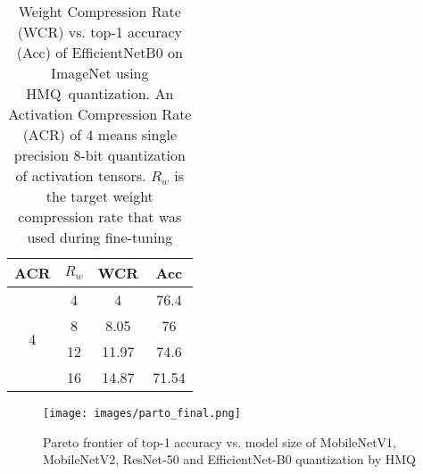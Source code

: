 \documentclass{article}
\newcommand{\qb}{HMQ}
\begin{document}
\begin{table}[h]
	\centering
	\caption{
		Weight Compression Rate (WCR) vs. top-1 accuracy (Acc) of EfficientNetB0 on ImageNet using \qb\ quantization.
		An Activation Compression Rate (ACR) of 4 means single precision 8-bit quantization of activation tensors.
		$R_w$ is the target weight compression rate that was used during fine-tuning
	}
	\label{tab:efficientnet_imagenet}
	\begin{tabular}{cccc}
		\hline
		ACR                & $R_w$ & WCR   & Acc   \\ \hline
		\multirow{4}{*}{4} & 4     & 4     & 76.4  \\
		& 8     & 8.05  & 76    \\
		& 12    & 11.97 & 74.6  \\
		& 16    & 14.87 & 71.54 \\ \hline
	\end{tabular}
\end{table}
\begin{figure}\centering
	\texttt{[image: images/parto\_final.png]}
	\caption{Pareto frontier of top-1 accuracy vs. model size of MobileNetV1, MobileNetV2, ResNet-50 and EfficientNet-B0 quantization by \qb}
	\label{fig:parto_imagenet}
\end{figure}
\end{document}
